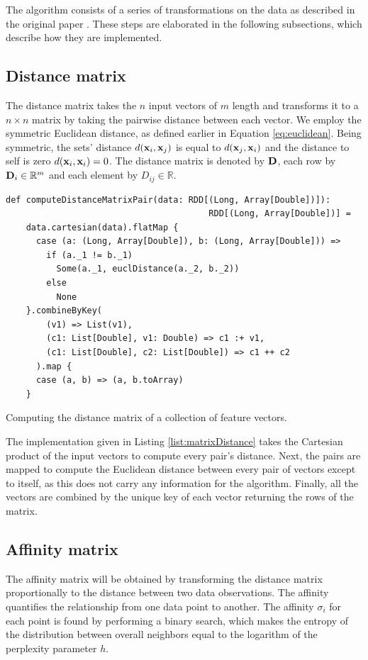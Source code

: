 The algorithm consists of a series of transformations on the data as described in the original paper \cite{MSU:CSE:00:2}. These steps are elaborated in the following subsections, which describe how they are implemented.

\subsection{Distance matrix \label{subsec:distancematrix}}
The distance matrix takes the $n$ input vectors of $m$ length and transforms it to a $n \times n$ matrix by taking the pairwise distance between each vector. We employ the symmetric Euclidean distance, as defined earlier in Equation \ref{eq:euclidean}. Being symmetric, the sets' distance $d({\bf x}_{i},{\bf x}_{j})$ is equal to $d({\bf x}_{j},{\bf x}_{i})$ and the distance to self is zero $d({\bf x}_{i},{\bf x}_{i}) = 0$. The distance matrix is denoted by ${\bf D}$, each row by ${\bf D}_{i} \in \mathbb{R}^{m}$ and each element by $D_{ij} \in \mathbb{R}$.

\begin{listing}[ht!]
\begin{verbatim}
def computeDistanceMatrixPair(data: RDD[(Long, Array[Double])]): 
                                        RDD[(Long, Array[Double])] =
    data.cartesian(data).flatMap {
      case (a: (Long, Array[Double]), b: (Long, Array[Double])) =>
        if (a._1 != b._1)
          Some(a._1, euclDistance(a._2, b._2))
        else
          None
    }.combineByKey(
        (v1) => List(v1),
        (c1: List[Double], v1: Double) => c1 :+ v1,
        (c1: List[Double], c2: List[Double]) => c1 ++ c2
      ).map {
      case (a, b) => (a, b.toArray)
    }
\end{verbatim}

\caption{Computing the distance matrix of a collection of feature vectors.}
\label{list:matrixDistance}
\end{listing}

The implementation given in Listing \ref{list:matrixDistance} takes the Cartesian product of the input vectors to compute every pair's distance. Next, the pairs are mapped to compute the Euclidean distance between every pair of vectors except to itself, as this does not carry any information for the algorithm. Finally, all the vectors are combined by the unique key of each vector returning the rows of the matrix.

\subsection{Affinity matrix \label{subsec:affinity}}
The affinity matrix will be obtained by transforming the distance matrix proportionally to the distance between two data observations. The affinity quantifies the relationship from one data point to another. The affinity $\sigma_{i}$ for each point is found by performing a binary search, which makes the entropy of the distribution between overall neighbors equal to the logarithm of the perplexity parameter $h$.

